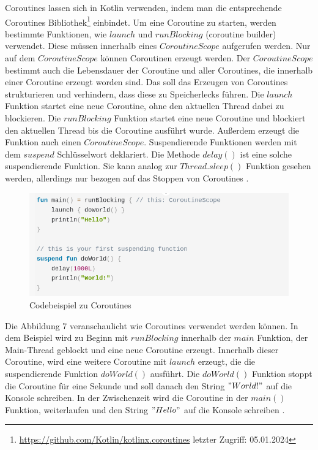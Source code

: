 \documentclass{article}
\begin{document}
Coroutines lassen sich in Kotlin verwenden, indem man die entsprechende Coroutines Bibliothek\footnote{\url{https://github.com/Kotlin/kotlinx.coroutines} letzter Zugriff: 05.01.2024} einbindet.  Um eine Coroutine zu starten, werden bestimmte Funktionen, wie $launch$ und $runBlocking$ (coroutine builder) verwendet. Diese müssen innerhalb eines $CoroutineScope$ aufgerufen werden. Nur auf dem $CoroutineScope$ können Coroutinen erzeugt werden. Der $CoroutineScope$ bestimmt auch die Lebensdauer der Coroutine und aller Coroutines, die innerhalb einer Coroutine erzeugt worden sind.  Das soll das Erzeugen von Coroutines strukturieren und verhindern, dass diese zu Speicherlecks führen.  Die $launch$ Funktion startet eine neue Coroutine, ohne den aktuellen Thread dabei zu blockieren. Die $runBlocking$ Funktion startet eine neue Coroutine und blockiert den aktuellen Thread bis die Coroutine ausführt wurde. Außerdem erzeugt die Funktion auch einen $CoroutineScope$.
Suspendierende Funktionen werden mit dem $suspend$ Schlüsselwort deklariert. Die Methode $delay()$ ist eine solche suspendierende Funktion. Sie kann analog zur $Thread.sleep()$ Funktion gesehen werden, allerdings nur bezogen auf das Stoppen von Coroutines \cite{KotlinLangDocCoroutines}.

\begin{figure}[!htb]
    \centering
    \includegraphics[width=0.9\columnwidth]{img/Coroutine.png}
    \caption{Codebeispiel zu Coroutines\footnotemark}
\end{figure}

Die Abbildung 7 veranschaulicht wie Coroutines verwendet werden können. In dem Beispiel wird zu Beginn mit $runBlocking$ innerhalb der $main$ Funktion, der Main-Thread geblockt und eine neue Coroutine erzeugt. Innerhalb dieser Coroutine, wird eine weitere Coroutine mit $launch$ erzeugt, die die suspendierende Funktion $doWorld()$ ausführt. Die $doWorld()$ Funktion stoppt die Coroutine für eine Sekunde und soll danach den String $"World!"$ auf die Konsole schreiben. In der Zwischenzeit wird die Coroutine in der $main()$ Funktion, weiterlaufen und den String $"Hello"$ auf die Konsole schreiben \cite{KotlinLangDocCoroutines}.
\end{document}
